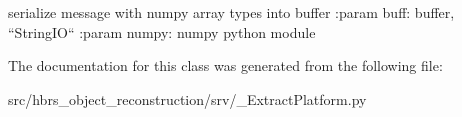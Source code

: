 \begin{DoxyVerb}
serialize message with numpy array types into buffer
:param buff: buffer, ``StringIO``
:param numpy: numpy python module
\end{DoxyVerb}
 

\-The documentation for this class was generated from the following file\-:\begin{DoxyCompactItemize}
\item 
src/hbrs\-\_\-object\-\_\-reconstruction/srv/\-\_\-\-Extract\-Platform.\-py\end{DoxyCompactItemize}
